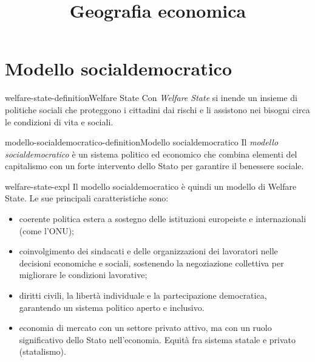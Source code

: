 \documentclass[preview]{standalone}
\begin{document}
\title{Geografia economica}
\genpage

\section{Modello socialdemocratico}

\begin{snippetdefinition}{welfare-state-definition}{Welfare State}
    Con \textit{Welfare State} si inende un insieme di politiche sociali
    che proteggono i cittadini dai rischi e li assistono nei bisogni circa le condizioni di vita e sociali.
\end{snippetdefinition}

\begin{snippetdefinition}{modello-socialdemocratico-definition}{Modello socialdemocratico}
    Il \textit{modello socialdemocratico} è un sistema politico ed economico che combina elementi del capitalismo con un forte intervento dello Stato per garantire il benessere sociale.
\end{snippetdefinition}

\begin{snippet}{welfare-state-expl}
    Il modello socialdemocratico è quindi un modello di Welfare State.
    Le sue principali caratteristiche sono:
    \begin{itemize}
        \item coerente politica estera a sostegno delle istituzioni europeiste e internazionali (come l'ONU);
        \item coinvolgimento dei sindacati e delle organizzazioni dei lavoratori nelle decisioni economiche e sociali, sostenendo la negoziazione collettiva per migliorare le condizioni lavorative;
        \item diritti civili, la libertà individuale e la partecipazione democratica, garantendo un sistema politico aperto e inclusivo.
        \item economia di mercato con un settore privato attivo, ma con un ruolo significativo dello Stato nell'economia.
            Equità fra sistema statale e privato (statalismo).
    \end{itemize}
\end{snippet}
\end{document}

